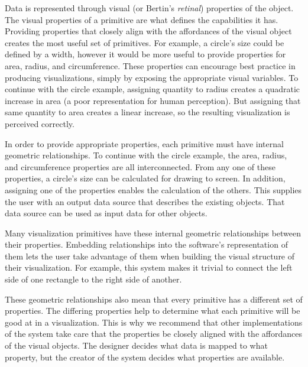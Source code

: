 Data is represented through visual (or Bertin's \textit{retinal}) properties of the object.
The visual properties of a primitive are what defines the capabilities it has.
Providing properties that closely align with the affordances of the visual object creates the most useful set of primitives.
For example, a circle's size could be defined by a width, however it would be more useful to provide properties for area, radius, and circumference.
These properties can encourage best practice in producing visualizations, simply by exposing the appropriate visual variables.
To continue with the circle example, assigning quantity to radius creates a quadratic increase in area (a poor representation for human perception).
But assigning that same quantity to area creates a linear increase, so the resulting visualization is perceived correctly.

In order to provide appropriate properties, each primitive must have internal geometric relationships.
To continue with the circle example, the area, radius, and circumference properties are all interconnected.
From any one of these properties, a circle's size can be calculated for drawing to screen.
In addition, assigning one of the properties enables the calculation of the others.
This supplies the user with an output data source that describes the existing objects.
That data source can be used as input data for other objects.

\label{internalGeometricRelationships}

Many visualization primitives have these internal geometric relationships between their properties.
Embedding relationships into the software's representation of them lets the user take advantage of them when building the visual structure of their visualization.
For example, this system makes it trivial to connect the left side of one rectangle to the right side of another.

These geometric relationships also mean that every primitive has a different set of properties.
The differing properties help to determine what each primitive will be good at in a visualization.
This is why we recommend that other implementations of the system take care that the properties be closely aligned with the affordances of the visual objects.
The designer decides what data is mapped to what property, but the creator of the system decides what properties are available.

\label{iteration}

